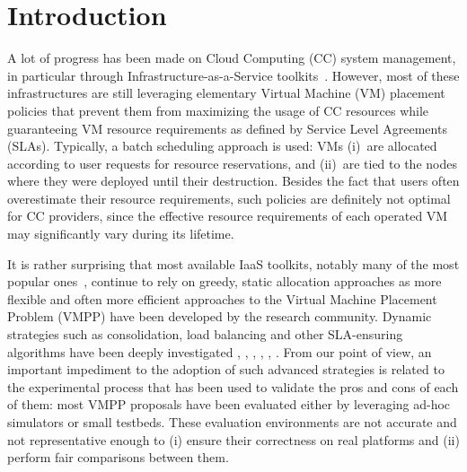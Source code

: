 \documentclass[conference]{IEEEtran}
\begin{document}




%
\IEEEpeerreviewmaketitle



\section{Introduction}
\label{sec:intro}

A lot of progress has been made on Cloud Computing (CC) system
management, in particular through Infrastructure-as-a-Service
toolkits~\cite{moreno:2012}. However, most of these infrastructures
are still leveraging elementary Virtual Machine (VM) placement
policies that prevent them
from maximizing the usage of CC resources while guaranteeing VM
resource requirements as defined by Service Level Agreements (SLAs).
Typically, a batch scheduling approach is used: VMs (i)~are allocated
according to user requests for resource reservations, and (ii)~are
tied to the nodes where they were deployed until their
destruction. Besides the fact that users often overestimate their
resource requirements, such policies are definitely not optimal for CC
providers, since the effective resource requirements of each operated
VM may significantly vary during its lifetime.

  It
is rather surprising that most available IaaS toolkits, notably many
of the most popular ones~\cite{openstack, opennebula, cloudstack},
continue to rely on greedy, static allocation approaches as more
flexible and often more efficient approaches to the Virtual Machine
Placement Problem (VMPP) have been developed by the research
community. Dynamic strategies such as consolidation, load balancing
and other SLA-ensuring algorithms have been deeply investigated
\cite{Hermenier:2009:ECM:1508293.1508300}, \cite{feller:ccgrid12},
\cite{quesnel:cpe2012}, \cite{5935254}, \cite{5715067},
\cite{5328077}.    From our point of view, an important
impediment to the adoption of such advanced strategies is related to
the experimental process that has been used to validate the pros and
cons of each of them: most VMPP proposals have been evaluated either
by leveraging ad-hoc simulators or small testbeds. These evaluation
environments are not accurate and not representative enough to (i)
ensure their correctness on real platforms and (ii) perform fair
comparisons between them.
\end{document}

